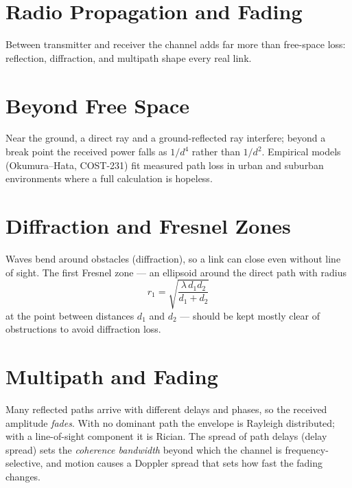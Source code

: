 \section{Radio Propagation and Fading}\label{sec:tb_propagation}



Between transmitter and receiver the channel adds far more than free-space loss:
reflection, diffraction, and multipath shape every real link.

\section{Beyond Free Space}
Near the ground, a direct ray and a ground-reflected ray interfere; beyond a
break point the received power falls as $1/d^4$ rather than $1/d^2$. Empirical
models (Okumura--Hata, COST-231) fit measured path loss in urban and suburban
environments where a full calculation is hopeless.

\section{Diffraction and Fresnel Zones}
Waves bend around obstacles (diffraction), so a link can close even without line
of sight. The first Fresnel zone --- an ellipsoid around the direct path with
radius
\[ r_1 = \sqrt{\frac{\lambda\, d_1 d_2}{d_1 + d_2}} \]
at the point between distances $d_1$ and $d_2$ --- should be kept mostly clear of
obstructions to avoid diffraction loss.

\section{Multipath and Fading}
Many reflected paths arrive with different delays and phases, so the received
amplitude \emph{fades}. With no dominant path the envelope is Rayleigh
distributed; with a line-of-sight component it is Rician. The spread of path
delays (delay spread) sets the \emph{coherence bandwidth} beyond which the channel
is frequency-selective, and motion causes a Doppler spread that sets how fast the
fading changes.



